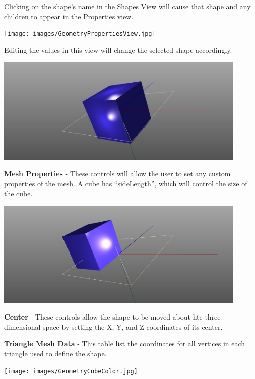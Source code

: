 Clicking on the shape's name in the Shapes View will cause that shape and any
children to appear in the Properties view. 

\begin{center}
\texttt{[image: images/GeometryPropertiesView.jpg]}
\end{center}

Editing the values in this view will change the selected shape
accordingly. 

\begin{center}
\includegraphics[width=12cm]{images/GeometryCubeSize.jpg}
\end{center}

\textbf{Mesh Properties} - These controls will allow the user to set any custom
properties of the mesh. A cube has ``sideLength'', which will control the size
of the cube.

\begin{center}
\includegraphics[width=12cm]{images/GeometryCubeTranslate.jpg}
\end{center}

\textbf{Center} - These controls allow the shape to be moved about hte three
dimensional space by setting the X, Y, and Z coordinates of its center.

\textbf{Triangle Mesh Data} - This table list the coordinates for all vertices
in each triangle used to define the shape.

\begin{center}
\texttt{[image: images/GeometryCubeColor.jpg]}
\end{center}


